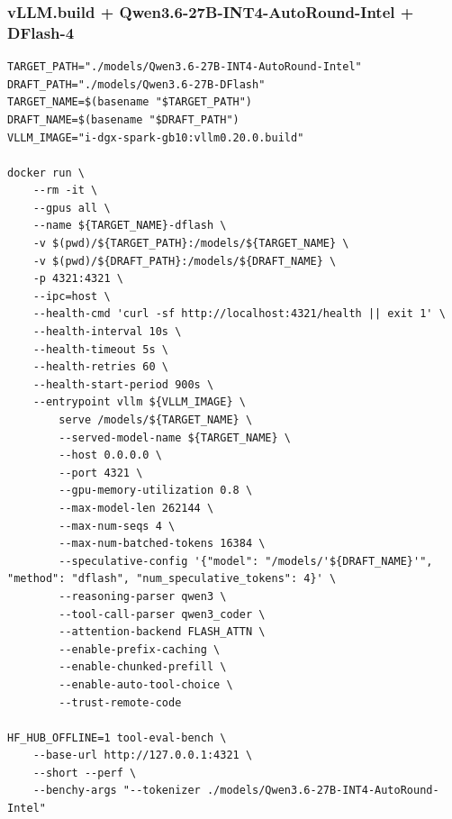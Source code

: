 \documentclass{article}
\begin{document}
\subsubsection{vLLM.build + Qwen3.6-27B-INT4-AutoRound-Intel + DFlash-4}
\begin{lstlisting}
TARGET_PATH="./models/Qwen3.6-27B-INT4-AutoRound-Intel"
DRAFT_PATH="./models/Qwen3.6-27B-DFlash"
TARGET_NAME=$(basename "$TARGET_PATH")
DRAFT_NAME=$(basename "$DRAFT_PATH")
VLLM_IMAGE="i-dgx-spark-gb10:vllm0.20.0.build"

docker run \
    --rm -it \
    --gpus all \
    --name ${TARGET_NAME}-dflash \
    -v $(pwd)/${TARGET_PATH}:/models/${TARGET_NAME} \
    -v $(pwd)/${DRAFT_PATH}:/models/${DRAFT_NAME} \
    -p 4321:4321 \
    --ipc=host \
    --health-cmd 'curl -sf http://localhost:4321/health || exit 1' \
    --health-interval 10s \
    --health-timeout 5s \
    --health-retries 60 \
    --health-start-period 900s \
    --entrypoint vllm ${VLLM_IMAGE} \
        serve /models/${TARGET_NAME} \
        --served-model-name ${TARGET_NAME} \
        --host 0.0.0.0 \
        --port 4321 \
        --gpu-memory-utilization 0.8 \
        --max-model-len 262144 \
        --max-num-seqs 4 \
        --max-num-batched-tokens 16384 \
        --speculative-config '{"model": "/models/'${DRAFT_NAME}'", "method": "dflash", "num_speculative_tokens": 4}' \
        --reasoning-parser qwen3 \
        --tool-call-parser qwen3_coder \
        --attention-backend FLASH_ATTN \
        --enable-prefix-caching \
        --enable-chunked-prefill \
        --enable-auto-tool-choice \
        --trust-remote-code

HF_HUB_OFFLINE=1 tool-eval-bench \
    --base-url http://127.0.0.1:4321 \
    --short --perf \
    --benchy-args "--tokenizer ./models/Qwen3.6-27B-INT4-AutoRound-Intel"
\end{lstlisting}
\end{document}
